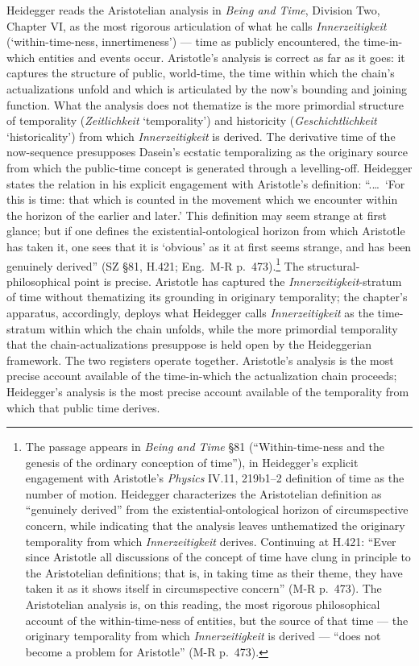 Heidegger reads the Aristotelian analysis in \textit{Being and Time}, Division Two, Chapter VI, as the most rigorous articulation of what he calls \textit{Innerzeitigkeit} (`within-time-ness, innertimeness') --- time as publicly encountered, the time-in-which entities and events occur. Aristotle's analysis is correct as far as it goes: it captures the structure of public, world-time, the time within which the chain's actualizations unfold and which is articulated by the now's bounding and joining function. What the analysis does not thematize is the more primordial structure of temporality (\textit{Zeitlichkeit} `temporality') and historicity (\textit{Geschichtlichkeit} `historicality') from which \textit{Innerzeitigkeit} is derived. The derivative time of the now-sequence presupposes Dasein's ecstatic temporalizing as the originary source from which the public-time concept is generated through a levelling-off. Heidegger states the relation in his explicit engagement with Aristotle's definition: ``.\ldots\ `For this is time: that which is counted in the movement which we encounter within the horizon of the earlier and later.' This definition may seem strange at first glance; but if one defines the existential-ontological horizon from which Aristotle has taken it, one sees that it is `obvious' as it at first seems strange, and has been genuinely derived'' (SZ \S 81, H.421; Eng.~M-R p.~473).\footnote{The passage appears in \textit{Being and Time} \S 81 (``Within-time-ness and the genesis of the ordinary conception of time''), in Heidegger's explicit engagement with Aristotle's \textit{Physics} IV.11, 219b1--2 definition of time as the number of motion. Heidegger characterizes the Aristotelian definition as ``genuinely derived'' from the existential-ontological horizon of circumspective concern, while indicating that the analysis leaves unthematized the originary temporality from which \textit{Innerzeitigkeit} derives. Continuing at H.421: ``Ever since Aristotle all discussions of the concept of time have clung in principle to the Aristotelian definitions; that is, in taking time as their theme, they have taken it as it shows itself in circumspective concern'' (M-R p.~473). The Aristotelian analysis is, on this reading, the most rigorous philosophical account of the within-time-ness of entities, but the source of that time --- the originary temporality from which \textit{Innerzeitigkeit} is derived --- ``does not become a problem for Aristotle'' (M-R p.~473).} The structural-philosophical point is precise. Aristotle has captured the \textit{Innerzeitigkeit}-stratum of time without thematizing its grounding in originary temporality; the chapter's apparatus, accordingly, deploys what Heidegger calls \textit{Innerzeitigkeit} as the time-stratum within which the chain unfolds, while the more primordial temporality that the chain-actualizations presuppose is held open by the Heideggerian framework. The two registers operate together. Aristotle's analysis is the most precise account available of the time-in-which the actualization chain proceeds; Heidegger's analysis is the most precise account available of the temporality from which that public time derives.


